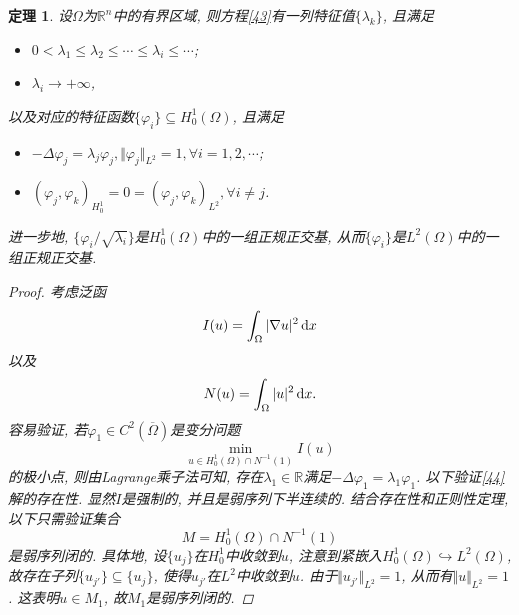 \documentclass[12pt,a4paper]{article}
\newtheorem{theorem}{定理}[section]
\begin{document}
\begin{theorem}\label{th2.49}
    设$\Omega$为$\mathbb{R}^n$中的有界区域, 则方程\eqref{43}有一列特征值$\{\lambda_k\}$, 且满足 
    \begin{itemize}
        \item $0 < \lambda_1 \leq \lambda_2 \leq \cdots \leq \lambda_i \leq \cdots$;
        \item $\lambda_i \rightarrow +\infty$,
    \end{itemize}
    以及对应的特征函数$\{\varphi_i\} \subseteq H_0^1(\Omega)$, 且满足 
    \begin{itemize}
        \item $-\Delta\varphi_j = \lambda_j\varphi_j, \Vert \varphi_j \Vert_{L^2} = 1, \forall i = 1, 2, \cdots$;
        \item $(\varphi_j, \varphi_k)_{H_0^1} = 0 = (\varphi_j, \varphi_k)_{L^2}, \forall i \neq j$.
    \end{itemize}
    进一步地, $\{\varphi_i/\sqrt{\lambda_i}\}$是$H_0^1(\Omega)$中的一组正规正交基, 从而$\{\varphi_i\}$是$L^2(\Omega)$中的一组正规正交基.
    \begin{proof}
        考虑泛函 
        \begin{equation*}
            I(u) = \int_{\Omega}|\nabla u|^2 \,{\rm d}x
        \end{equation*}
        以及 
        \begin{equation*}
            N(u) = \int_{\Omega}|u|^2 \,{\rm d}x.
        \end{equation*}
        容易验证, 若$\varphi_1 \in C^2(\overline{\Omega})$是变分问题 
        \begin{equation}\label{44}
            \min_{u \in H_0^1(\Omega) \cap N^{-1}(1)}I(u)
        \end{equation}
        的极小点, 则由Lagrange乘子法可知, 存在$\lambda_1 \in \mathbb{R}$满足$-\Delta\varphi_1 = \lambda_1\varphi_1$.
        以下验证\eqref{44}解的存在性. 显然$I$是强制的, 并且是弱序列下半连续的.
        结合存在性和正则性定理, 以下只需验证集合 
        \begin{equation*}
            M = H_0^1(\Omega) \cap N^{-1}(1)
        \end{equation*}
        是弱序列闭的. 具体地, 设$\{u_j\}$在$H_0^1$中收敛到$u$, 注意到紧嵌入$H_0^1(\Omega) \hookrightarrow L^2(\Omega)$, 故存在子列$\{u_{j'}\} \subseteq \{u_j\}$, 使得$u_{j'}$在$L^2$中收敛到$u$.
        由于$\Vert u_{j'} \Vert_{L^2} = 1$, 从而有$\Vert u \Vert_{L^2} = 1$.
        这表明$u \in M_1$, 故$M_1$是弱序列闭的. 


\end{proof}
\end{theorem}
\end{document}
